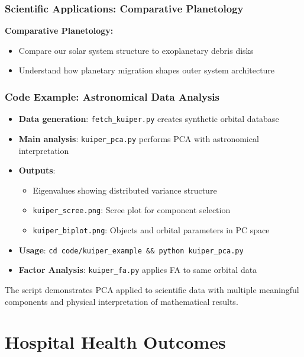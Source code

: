 \documentclass[aspectratio=169]{beamer}
\begin{document}
\begin{frame}
    \frametitle{Scientific Applications: Comparative Planetology}
    \textbf{Comparative Planetology:}
    \begin{itemize}
        \item Compare our solar system structure to exoplanetary debris disks \pause
        \item Understand how planetary migration shapes outer system architecture \pause
    \end{itemize}
\end{frame}

\begin{frame}
    \frametitle{Code Example: Astronomical Data Analysis}
    \begin{itemize}
        \item \textbf{Data generation}: \texttt{fetch\_kuiper.py} creates synthetic orbital database \pause
        \item \textbf{Main analysis}: \texttt{kuiper\_pca.py} performs PCA with astronomical interpretation \pause
        \item \textbf{Outputs}:
              \begin{itemize}
                  \item Eigenvalues showing distributed variance structure \pause
                  \item \texttt{kuiper\_scree.png}: Scree plot for component selection \pause
                  \item \texttt{kuiper\_biplot.png}: Objects and orbital parameters in PC space \pause
              \end{itemize}
        \item \textbf{Usage}: \texttt{cd code/kuiper\_example \&\& python kuiper\_pca.py} \pause
        \item \textbf{Factor Analysis}: \texttt{kuiper\_fa.py} applies FA to same orbital data \pause
    \end{itemize}
    \vspace{6pt}
    The script demonstrates PCA applied to scientific data with multiple meaningful components and physical interpretation of mathematical results.
\end{frame}

\section{Hospital Health Outcomes}
\end{document}
